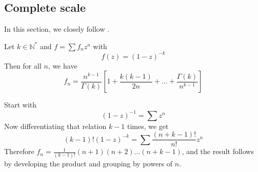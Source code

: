 \documentclass[../main.tex]{subfiles}
\begin{document}
%
%	
%	
%	


\subsection{Complete scale}

In this section, we closely follow \cite{Jungen1931}.

\begin{lemma}{}
	Let $k \in \mathbb{N}^*$ and $f = \sum f_n z^n$ with
	$$
	f(z) = {(1 - z)}^{-k}
	$$
	Then for all $n$, we have
	$$
	f_n = \frac{n^{k - 1}}{\Gamma(k)} \left[1 + \frac{k(k-1)}{2n} + \dots + \frac{\Gamma(k)}{n^{k-1}}\right]
	$$
	
	\tcblower
	
	Start with
	$${(1 - z)}^{-1} = \sum z^n$$
	Now differentiating that relation $k - 1$ times, we get
	$$
	(k-1)! {(1-z)}^{-k} = \sum \frac{(n + k -1)!}{n!}z^n
	$$
	Therefore $f_n = \frac{1}{(k-1)!} (n+1)(n+2)\dots(n+k-1)$, and the result follows by developing the product and grouping by powers of $n$.
\end{lemma}
\end{document}
